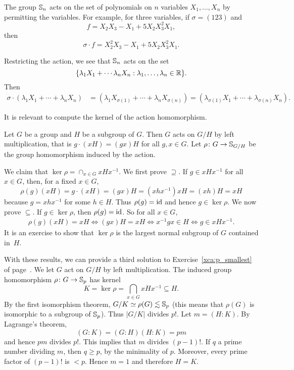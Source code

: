 \begin{example}
    The group $\mathbb{S}_n$ acts on the set of polynomials on
    $n$ variables $X_1,\dots,X_n$
    by permitting the variables. For example, for three variables, if 
    $\sigma=(123)$ and 
    \[
    f=X_2X_3-X_1+5X_2X_3^2X_1,
    \]
    then 
    \[
    \sigma\cdot f=X_2^2X_3-X_1+5X_2X_3^2X_1.
    \]

    Restricting the action, we see that 
    $\mathbb{S}_n$ acts on the set 
    \[
    \{\lambda_1X_1+\cdots\lambda_nX_n:\lambda_1,\dots,\lambda_n\in\mathbb{R}\}.
    \]
    Then 
    \begin{align*}
    \sigma \cdot (\lambda_1X_1+\cdots+\lambda_nX_n) &= (\lambda_1X_{\sigma(1)}+\cdots+\lambda_nX_{\sigma(n)})
    =(\lambda_{\sigma(1)}X_1+\cdots+\lambda_{\sigma(n)}X_n).
    \end{align*}
\end{example}

It is relevant to compute the kernel of the action homomorphism. 

\begin{example}
Let $G$ be a group and $H$ be a subgroup of $G$. Then $G$ 
acts on $G/H$ by left multiplication, that is 
$g\cdot (xH)=(gx)H$ for all $g,x\in G$. Let $\rho\colon G\to\mathbb{S}_{G/H}$ be the group homomorphism induced by the action. 

We claim that $\ker\rho=\cap_{x\in G}xHx^{-1}$. 
We first prove $\supseteq$. If $g\in xHx^{-1}$ for all 
$x\in G$, then, for a fixed $x\in G$,
 \[
 \rho(g)(xH)=g\cdot (xH)=(gx)H=(xhx^{-1})xH=(xh)H=xH
 \]
because $g=xhx^{-1}$ for some $h\in H$. Thus $\rho(g)=\operatorname{id}$ 
and hence $g\in\ker\rho$. We now prove 
$\subseteq$. If $g\in\ker\rho$, then
 $\rho(g)=\operatorname{id}$. So for all $x\in G$,
 \begin{align*}
\rho(g)(xH)=xH
\Longleftrightarrow (gx)H=xH
\Longleftrightarrow x^{-1}gx\in H
\Longleftrightarrow g\in xHx^{-1}.
 \end{align*}
It is an exercise to show that
$\ker\rho$ is the largest normal subgroup of $G$ 
contained in~$H$.
\end{example}

With these results, we can provide a third 
solution to Exercise~\ref{xca:p_smallest} of 
page~\pageref{xca:p_smallest}.
We let  $G$ act on $G/H$ by left multiplication. 
The induced group homomorphism  $\rho\colon G\to\mathbb{S}_p$ has 
kernel 
\[
K=\ker\rho=\bigcap_{x\in G}xHx^{-1}\subseteq H.
\]
By the first isomorphism theorem, 
$G/K\simeq\rho(G)\lesssim\mathbb{S}_p$ (this means that 
$\rho(G)$ is isomorphic to a subgroup of $\mathbb{S}_p$). 
Thus $|G/K|$ divides $p!$.
Let $m=(H:K)$. By Lagrange's theorem,
\[
(G:K)=(G:H)(H:K)=pm
\]
and hence $pm$ divides $p!$. This implies that $m$ divides $(p-1)!$. If $q$ a prime number dividing 
 $m$, then $q\geq p$, by the minimality of $p$. Moreover, 
 every prime factor of $(p-1)!$ is 
 $<p$. Hence $m=1$ and therefore $H=K$.

